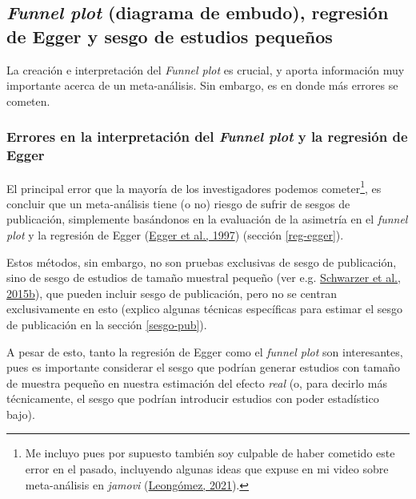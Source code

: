 \documentclass[
  bookmarksnumbered]{article}
\begin{document}
\hypertarget{funnel-inf}{%
\subsection{\texorpdfstring{\emph{Funnel plot} (diagrama de embudo), regresión de Egger y sesgo de estudios pequeños}{Funnel plot (diagrama de embudo), regresión de Egger y sesgo de estudios pequeños}}\label{funnel-inf}}

La creación e interpretación del \emph{Funnel plot} es crucial, y aporta información muy importante acerca de un meta-análisis. Sin embargo, es en donde más errores se cometen.

\hypertarget{err-funnel-egger}{%
\subsubsection{\texorpdfstring{Errores en la interpretación del \emph{Funnel plot} y la regresión de Egger}{Errores en la interpretación del Funnel plot y la regresión de Egger}}\label{err-funnel-egger}}

El principal error que la mayoría de los investigadores podemos cometer\footnote{Me incluyo pues por supuesto también soy culpable de haber cometido este error en el pasado, incluyendo algunas ideas que expuse en mi video sobre meta-análisis en \emph{jamovi} (\protect\hyperlink{ref-leongomezMetaanalysis2021}{Leongómez, 2021}).}, es concluir que un meta-análisis tiene (o no) riesgo de sufrir de sesgos de publicación, simplemente basándonos en la evaluación de la asimetría en el \emph{funnel plot} y la regresión de Egger (\protect\hyperlink{ref-eggerBiasMetaanalysisDetected1997}{Egger et al., 1997}) (sección \ref{reg-egger}).

Estos métodos, sin embargo, no son pruebas exclusivas de sesgo de publicación, sino de sesgo de estudios de tamaño muestral pequeño (ver e.g. \protect\hyperlink{ref-schwarzerSmallStudyEffectsMetaAnalysis2015}{Schwarzer et al., 2015b}), que pueden incluir sesgo de publicación, pero no se centran exclusivamente en esto (explico algunas técnicas específicas para estimar el sesgo de publicación en la sección \ref{sesgo-pub}).

A pesar de esto, tanto la regresión de Egger como el \emph{funnel plot} son interesantes, pues es importante considerar el sesgo que podrían generar estudios con tamaño de muestra pequeño en nuestra estimación del efecto \emph{real} (o, para decirlo más técnicamente, el sesgo que podrían introducir estudios con poder estadístico bajo).
\end{document}
